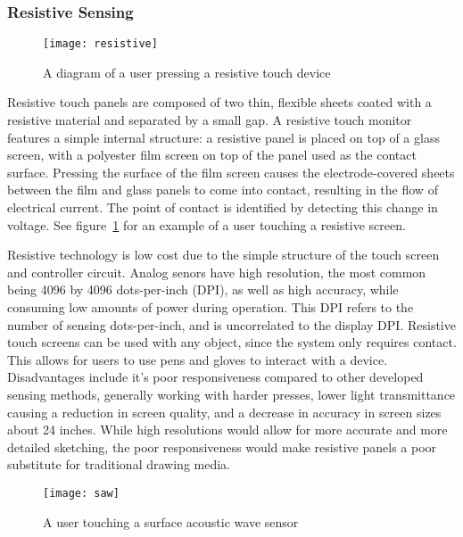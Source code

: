 \subsubsection{Resistive Sensing}
\begin{figure}
	\centering
		\texttt{[image: resistive]}
	\caption{A diagram of a user pressing a resistive touch device \cite{touchtech}} 
	\label{fig:resistivetouch}
\end{figure}
Resistive touch panels are composed of two thin, flexible sheets coated with a resistive material and separated by a small gap.
A resistive touch monitor features a simple internal structure: a resistive panel is placed on top of a glass screen, with a polyester film screen on top of the panel used as the contact surface. 
Pressing the surface of the film screen causes the electrode-covered sheets between the film and glass panels to come into contact, resulting in the flow of electrical current. 
The point of contact is identified by detecting this change in voltage. See figure~\ref{fig:resistivetouch} for an example of a user touching a resistive screen.

Resistive technology is low cost due to the simple structure of the touch screen and controller circuit.
Analog senors have high resolution, the most common being 4096 by 4096 dots-per-inch (DPI), as well as high accuracy, while consuming low amounts of power during operation.
This DPI refers to the number of sensing dots-per-inch, and is uncorrelated to the display DPI.
Resistive touch screens can be used with any object, since the system only requires contact. 
This allows for users to use pens and gloves to interact with a device.
Disadvantages include it's poor responsiveness compared to other developed sensing methods, generally working with harder presses, lower light transmittance causing a reduction in screen quality, and a decrease in accuracy in screen sizes about 24 inches.
While high resolutions would allow for more accurate and more detailed sketching, the poor responsiveness would make resistive panels a poor substitute for traditional drawing media.

\begin{center}
\begin{figure}
\texttt{[image: saw]}
\caption{A user touching a surface acoustic wave sensor \cite{touchtech}}
\label{fig:sawsensing}
\end{figure}
\end{center}
 
